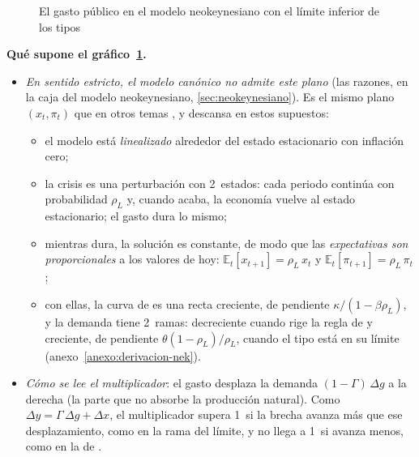 \documentclass[11pt]{article}
\begin{document}
\begin{figure}[H]
\centering
\caption{El gasto público en el modelo neokeynesiano con el límite inferior de los tipos}\label{fig:nek-limite-inferior}
\end{figure}

\begin{anotaciones}
\textbf{Qué supone el gráfico~\ref{fig:nek-limite-inferior}.}
\begin{itemize}
\item \emph{En sentido estricto, el modelo canónico no admite este plano} (las razones, en la caja del modelo neokeynesiano, \ref{sec:neokeynesiano}). Es el mismo plano $(x_t,\pi_t)$ que en otros temas  , y descansa en estos supuestos:
  \begin{itemize}
  \item el modelo está \emph{linealizado} alrededor del estado estacionario con inflación cero;
  \item la crisis es una perturbación con 2~estados: cada periodo continúa con probabilidad $\rho_L$ y, cuando acaba, la economía vuelve al estado estacionario; el gasto dura lo mismo;
  \item mientras dura, la solución es constante, de modo que las \emph{expectativas son proporcionales} a los valores de hoy: $\mathbb{E}_t[x_{t+1}]=\rho_L\,x_t$ y $\mathbb{E}_t[\pi_{t+1}]=\rho_L\,\pi_t$;
  \item con ellas, la curva de  es una recta creciente, de pendiente $\kappa/(1-\beta\rho_L)$, y la demanda tiene 2~ramas: decreciente cuando rige la regla de  y creciente, de pendiente $\theta(1-\rho_L)/\rho_L$, cuando el tipo está en su límite (anexo~\ref{anexo:derivacion-nek}).
  \end{itemize}
\item \emph{Cómo se lee el multiplicador}: el gasto desplaza la demanda $(1-\Gamma)\,\Delta g$ a la derecha (la parte que no absorbe la producción natural). Como $\Delta y=\Gamma\,\Delta g+\Delta x$, el multiplicador supera 1~si la brecha avanza más que ese desplazamiento, como en la rama del límite, y no llega a 1~si avanza menos, como en la de .
\end{itemize}
\end{anotaciones}
\end{document}
